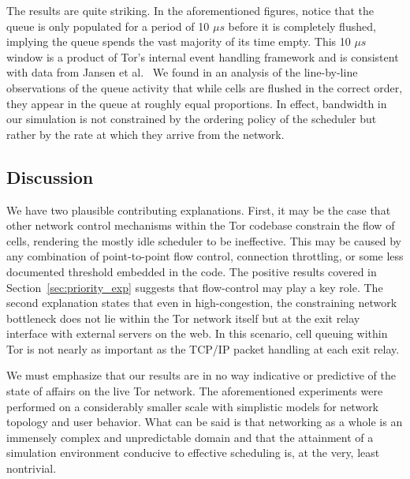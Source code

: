 The results are quite striking. In the aforementioned figures, notice that the
queue is only populated for a period of 10 $\mu s$ before it is completely
flushed, implying the queue spends the vast majority of its time empty. This 10
$\mu s$ window is a product of Tor's internal event handling framework and is
consistent with data from Jansen et al.~\cite{jansen2017tor} We found in an
analysis of the line-by-line observations of the queue activity that while cells
are flushed in the correct order, they appear in the queue at roughly equal
proportions. In effect, bandwidth in our simulation is not constrained by the
ordering policy of the scheduler but rather by the rate at which they arrive
from the network.

\subsection{Discussion}

We have two plausible contributing explanations. First, it may be the case that
other network control mechanisms within the Tor codebase constrain the flow of
cells, rendering the mostly idle scheduler to be ineffective. This may be caused
by any combination of point-to-point flow control, connection throttling, or
some less documented threshold embedded in the code. The positive results
covered in Section~\ref{sec:priority_exp} suggests that flow-control may play a
key role. The second explanation states that even in high-congestion, the
constraining network bottleneck does not lie within the Tor network itself but
at the exit relay interface with external servers on the web. In this scenario,
cell queuing within Tor is not nearly as important as the TCP/IP packet handling
at each exit relay.

We must emphasize that our results are in no way indicative or predictive of the
state of affairs on the live Tor network. The aforementioned experiments were
performed on a considerably smaller scale with simplistic models for network
topology and user behavior. What can be said is that networking as a whole is an
immensely complex and unpredictable domain and that the attainment of a
simulation environment conducive to effective scheduling is, at the very, least
nontrivial.
